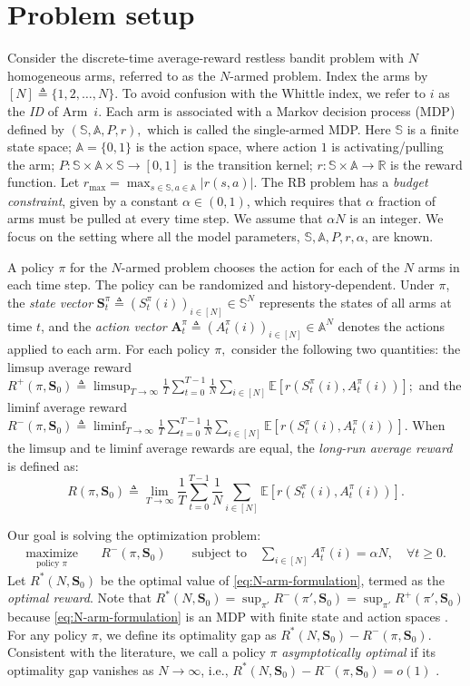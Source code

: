 \documentclass[11pt,letterpaper]{article}
\theoremstyle{plain}
\theoremstyle{definition}
\theoremstyle{remark}
\newcommand{\E}[1]{\mathbb{E}\left[#1\right]}
\newcommand{\abs}[1]{\left\lvert#1\right\rvert}
\newcommand{\ve}[1]{\bm{#1}}
\newcommand{\veS}{\ve{S}}
\newcommand{\sspa}{\mathbb{S}}
\newcommand{\aspa}{\mathbb{A}}
\newcommand{\sumN}{\sum_{i\in[N]}}
\newcommand{\rmax}{r_{\max}}
\newcommand{\ravg}{R}
\newcommand{\rsysn}{\ravg(\pi, \veS_0)}
\newcommand{\rliminf}{\ravg^{-}(\pi, \veS_0)}
\newcommand{\rlimsup}{\ravg^{+}(\pi, \veS_0)}
\newcommand{\ropt}{\ravg^*(N, \veS_0)}
\begin{document}
\section{Problem setup}
Consider the discrete-time average-reward restless bandit problem with $N$ homogeneous arms, referred to as the $N$-armed problem. Index the arms by $[N] \triangleq \{1,2,\dots, N\}.$
To avoid confusion with the Whittle index, we refer to $i$ as the \emph{ID} of Arm~$i$. Each arm is associated with a Markov decision process (MDP) defined by  $(\sspa, \aspa, P, r),$ which is called the single-armed MDP. 
Here $\sspa$ is a finite state space; 
$\aspa = \{0, 1\}$ is the action space, where action $1$ is activating/pulling the arm; 
$P:\sspa\times\aspa\times\sspa \to [0,1]$ is the transition kernel; 
$r: \sspa \times \aspa \to \mathbb{R}$ is the reward function. 
Let $\rmax = \max_{s\in\sspa,a\in\aspa} \abs{r(s,a)}$.
The RB problem has a \emph{budget constraint}, given by a constant $\alpha\in(0,1)$, which requires that $\alpha$ fraction of arms must be pulled at every time step. We assume that $\alpha N$ is an integer. 
We focus on the setting where all the model parameters, $\sspa, \aspa, P, r, \alpha$, are known. 


A policy $\pi$ for the $N$-armed problem chooses the action for each of the $N$ arms in each time step.
The policy can be randomized and history-dependent. 
Under $\pi$, the \emph{state vector} $\ve{S}_t^\pi \triangleq (S_t^\pi(i))_{i\in[N]} \in \sspa^N$ represents the states of all arms at time $t$, and the \emph{action vector}  $\ve{A}_t^\pi \triangleq (A_t^\pi(i))_{i\in[N]} \in \aspa^N$ denotes the actions applied to each arm. 
For each policy $\pi,$ consider the following two quantities: the limsup average reward
$\rlimsup \triangleq \limsup_{T\to\infty} \frac{1}{T} \sum_{t=0}^{T-1} \frac{1}{N} \sumN \E{r(S_t^\pi(i), A_t^\pi(i))};$ and the liminf average reward $\rliminf \triangleq \liminf_{T\to\infty} \frac{1}{T} \sum_{t=0}^{T-1} \frac{1}{N} \sumN \E{r(S_t^\pi(i), A_t^\pi(i))}$.  
When the limsup and te liminf average rewards are equal, the \emph{long-run average reward} is defined as: 
\[
    \rsysn \triangleq \lim_{T\to\infty} \frac{1}{T} \sum_{t=0}^{T-1} \frac{1}{N} \sumN \E{r(S_t^\pi(i), A_t^\pi(i))}.
\]

Our goal is solving the optimization problem:
\begin{align}
    \label{eq:N-arm-formulation} \tag{RB}
    \underset{\text{policy } \pi}{\text{maximize}} & \quad \rliminf  \qquad
    \text{subject to}  
    \quad  \sumN A_t^\pi(i) = \alpha N,\quad \forall t\ge 0. 
\end{align} 
Let $\ropt$ be the optimal value of \eqref{eq:N-arm-formulation}, termed as the \emph{optimal reward}. 
Note that $\ropt = \sup_{\pi'} R^-(\pi', \veS_0) = \sup_{\pi'} R^+(\pi', \veS_0)$ because \eqref{eq:N-arm-formulation} is an MDP with finite state and action spaces \citep[][Theorem~9.1.6]{Put_05}. 
For any policy $\pi$, we define its optimality gap as $\ropt - \rliminf$. Consistent with the literature, we call a policy $\pi$ \emph{asymptotically optimal} if its optimality gap vanishes as $N\to\infty$, i.e., $\ropt - \rliminf = o(1)$ \cite[][Definition 4.11]{Ver_16_verloop}. 
\end{document}
